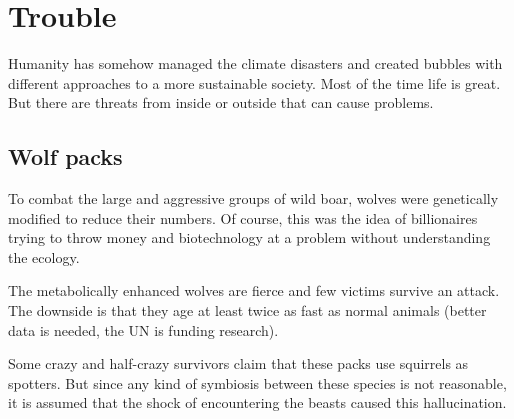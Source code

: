 \chapter{Trouble}

Humanity has somehow managed the climate disasters and created bubbles with different approaches to a more sustainable society. Most of the time life is great. But there are threats from inside or outside that can cause problems.


\section{Wolf packs}

To combat the large and aggressive groups of wild boar, wolves were genetically modified to reduce their numbers. Of course, this was the idea of billionaires trying to throw money and biotechnology at a problem without understanding the ecology.

The metabolically enhanced wolves are fierce and few victims survive an attack. The downside is that they age at least twice as fast as normal animals (better data is needed, the UN is funding research).

Some crazy and half-crazy survivors claim that these packs use squirrels as spotters. But since any kind of symbiosis between these species is not reasonable, it is assumed that the shock of encountering the beasts caused this hallucination.






